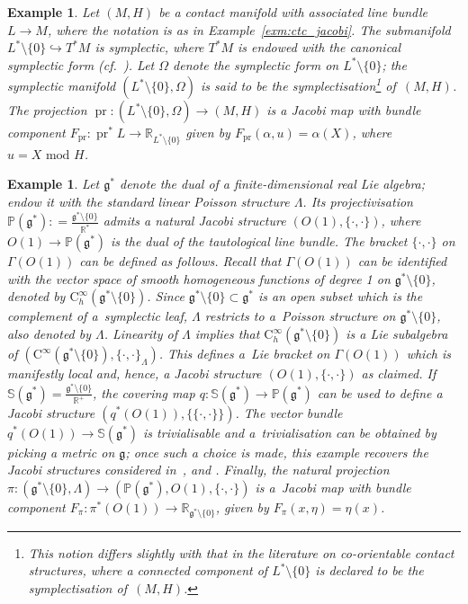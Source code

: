 \documentclass[10pt,a4paper]{amsart}
\numberwithin{equation}{section}
\newtheorem{Example}[Theorem]{Example}
\newcommand{\CM}{(M,H)} %
\newcommand{\SYM}{L^* \setminus \{0\}} %
\newcommand{\pg}{\mathbb{P}(\mathfrak{g}^*)} %
\newcommand{\RR}{\mathbb{R}}
\begin{document}
\begin{Example}\label{exm:symplectisation}
Let $\CM$ be a contact manifold with associated line bundle $L \to M$, where the notation is as in Example~\ref{exm:ctc_jacobi}. The submanifold $L^* \setminus \{0\} \hookrightarrow T^*M$ is symplectic, where $T^*M$ is endowed with the canonical symplectic form (cf.\ \cite[Def\/inition~2.3]{lerman_contact_toric}). Let $\Omega$ denote the symplectic form on $L^* \setminus \{0\}$; the symplectic manifold $(\SYM, \Omega)$ is said to be the {\it symplectisation}\footnote{This notion dif\/fers slightly with that in the literature on co-orientable contact structures, where a connected component of $\SYM$ is declared to be the symplectisation of~$\CM$.} of~$\CM$. The projection $\operatorname{pr} \colon (\SYM,\Omega) \to \CM$ is a Jacobi map with bundle component $F_{\operatorname{pr}} \colon \operatorname{pr}^* L \to \RR_{\SYM}$
 given by $F_{\operatorname{pr}}(\alpha, u) = \alpha(X)$, where $u = X \text{ mod } H$.
\end{Example}

\begin{Example}\label{exm:proj_dual_lie_algebra} Let $\mathfrak{g}^*$ denote the dual of a f\/inite-dimensional real Lie algebra; endow it with the standard linear Poisson structure $\Lambda$. Its projectivisation $\pg : =\frac{\mathfrak{g}^* \setminus \{0\}}{\RR^*}$ admits a natural Jacobi structure $(O(1),\{\cdot,\cdot\})$, where $O(1) \to \pg$ is the dual of the tautological line bundle. The bracket $\{\cdot,\cdot\}$ on $ \Gamma(O(1))$ can be def\/ined as follows. Recall that $\Gamma(O(1))$ can be identif\/ied with the vector space of smooth homogeneous functions of degree 1 on $\mathfrak{g}^* \setminus \{0\}$, denoted by $\mathrm{C}^{\infty}_{h}(\mathfrak{g}^* \setminus \{0\})$. Since $\mathfrak{g}^* \setminus \{0\} \subset \mathfrak{g}^*$ is an open subset which is the complement of a~symplectic leaf, $\Lambda$ restricts to a~Poisson structure on $\mathfrak{g}^* \setminus \{0\}$, also denoted by $\Lambda$. Linearity of $\Lambda$ implies that $\mathrm{C}^{\infty}_{h}(\mathfrak{g}^* \setminus \{0\})$ is a Lie subalgebra of $(\mathrm{C}^{\infty}(\mathfrak{g}^* \setminus \{0\}), \{\cdot,\cdot\}_{\Lambda})$. This def\/ines a~Lie bracket on $\Gamma(O(1))$ which is manifestly local and, hence, a Jacobi structure $(O(1),\{\cdot,\cdot\})$ as claimed. If $\mathbb{S}(\mathfrak{g}^*) = \frac{\mathfrak{g}^* \setminus \{0\}}{\RR^+}$, the covering map $q \colon \mathbb{S}(\mathfrak{g}^*) \to \pg$ can be used to def\/ine a Jacobi structure $(q^*(O(1)),\{\{\cdot,\cdot\}\})$. The vector bundle $q^*(O(1)) \to \mathbb{S}(\mathfrak{g}^*)$ is trivialisable and a~trivialisation can be obtained by picking a metric on $\mathfrak{g}$; once such a choice is made, this example recovers the Jacobi structures considered in~\cite{deleon,Lich78}, and \cite[Example~2.3]{Zambon}. Finally, the natural projection $\pi \colon (\mathfrak{g}^* \setminus \{0\},\Lambda) \to (\pg, O(1),\{\cdot,\cdot\})$ is a~Jacobi map with bundle component $F_{\pi}\colon \pi^*(O(1)) \to \RR_{\mathfrak{g}^* \setminus \{0\}}$, given by $F_{\pi}(x,\eta) = \eta(x)$.
\end{Example}
\end{document}
